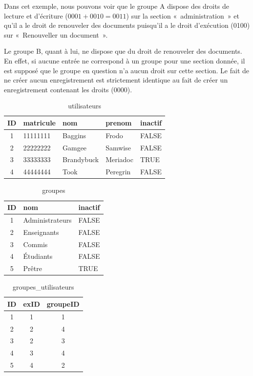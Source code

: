\documentclass[letter, 11pt]{report}
\begin{document}
Dans cet exemple, nous pouvons voir que le groupe A dispose des droits de lecture et d'écriture ($ 0001 + 0010 = 0011 $) sur la section «~administration~» et qu'il a le droit de renouveler des documents puisqu'il a le droit d'exécution (0100) sur «~Renouveller un document~».

Le groupe B, quant à lui, ne dispose que du droit de renouveler des documents. En effet, si aucune entrée ne correspond à un groupe pour une section donnée, il est supposé que le groupe en question n'a aucun droit sur cette section. Le fait de ne créer aucun enregistrement est strictement identique au fait de créer un enregistrement contenant les droits (0000).

\begin{table}[h!]
	\caption{utilisateurs}
	\begin{center}
		\begin{tabular}{|c|l|l|l|l|}
			\hline
			ID & matricule & nom         & prenom   & inactif \\
			\hline
			1  & 11111111  & Baggins     & Frodo    & FALSE \\
			2  & 22222222  & Gamgee      & Samwise  & FALSE \\
			3  & 33333333  & Brandybuck  & Meriadoc & TRUE \\
			4  & 44444444  & Took        & Peregrin & FALSE \\
			\hline
		\end{tabular}
	\end{center}
\end{table}

\begin{table}[h!]
	\caption{groupes}
	\begin{center}
		\begin{tabular}{|c|l|l|}
			\hline
			ID & nom               & inactif \\
			\hline
			1  & Administrateurs   & FALSE \\
			2  & Enseignants       & FALSE \\
			3  & Commis            & FALSE \\
			4  & Étudiants         & FALSE \\
			5  & Prêtre            & TRUE \\
			\hline
		\end{tabular}
	\end{center}
\end{table}

\begin{table}[h!]
	\caption{groupes\_utilisateurs}
	\begin{center}
		\begin{tabular}{|c|c|c|}
			\hline
			ID & exID & groupeID \\
			\hline
			1  & 1    & 1 \\
			2  & 2    & 4 \\
			3  & 2    & 3 \\
			4  & 3    & 4 \\
			5  & 4    & 2 \\
			\hline
		\end{tabular}
	\end{center}
\end{table}
\end{document}
